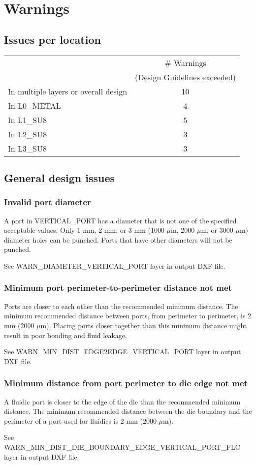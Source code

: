\documentclass[twoside]{article}
\begin{document}
\section{Warnings}
\subsection{Issues per location}
\begin{tabular}{l|c}
 & \# Warnings \\
 & (Design Guidelines exceeded) \\ \hline
In multiple layers or overall design& 10\\
In L0\_METAL& 4\\
In L1\_SU8 & 5\\
In L2\_SU8 & 3\\
In L3\_SU8 & 3\\
\end{tabular}

\subsection{General design issues}
\subsubsection{Invalid port diameter}
\par A port in VERTICAL\_PORT has a diameter that is not one of the specified
acceptable values. Only 1 mm, 2 mm, or 3 mm (1000 $\mu$m, 2000 $\mu$m, or 3000
$\mu$m) diameter holes can be punched. Ports that have other diameters will not
be punched.  \par See WARN\_DIAMETER\_VERTICAL\_PORT layer in output DXF file.

\subsubsection{Minimum port perimeter-to-perimeter distance not met}
\par Ports are closer to each other than the recommended minimum distance. The
minimum recommended distance between ports, from perimeter to perimeter, is 2 mm
(2000 $\mu$m). Placing ports closer together than this minimum distance might
result in poor bonding and fluid leakage.  \par See
WARN\_MIN\_DIST\_EDGE2EDGE\_VERTICAL\_PORT layer in output DXF file.

\subsubsection{Minimum distance from port perimeter to die edge not met}
\par A fluidic port is closer to the edge of the die than the recommended
minimum distance. The minimum recommended distance between the die boundary and
the perimeter of a port used for fluidics is 2 mm (2000 $\mu$m).  \par See
WARN\_MIN\_DIST\_DIE\_BOUNDARY\_EDGE\_VERTICAL\_PORT\_FLC layer in output DXF
file.
\end{document}
